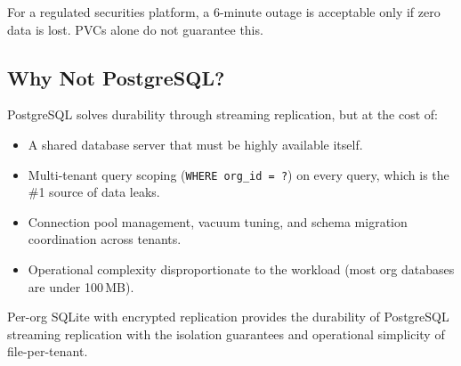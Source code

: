 For a regulated securities platform, a 6-minute outage is acceptable
only if zero data is lost. PVCs alone do not guarantee this.

\subsection{Why Not PostgreSQL?}

PostgreSQL solves durability through streaming replication, but at the
cost of:

\begin{itemize}[nosep]
  \item A shared database server that must be highly available itself.
  \item Multi-tenant query scoping (\texttt{WHERE org\_id = ?}) on
    every query, which is the \#1 source of data leaks.
  \item Connection pool management, vacuum tuning, and schema migration
    coordination across tenants.
  \item Operational complexity disproportionate to the workload (most
    org databases are under 100\,MB).
\end{itemize}

Per-org SQLite with encrypted replication provides the durability of
PostgreSQL streaming replication with the isolation guarantees and
operational simplicity of file-per-tenant.


